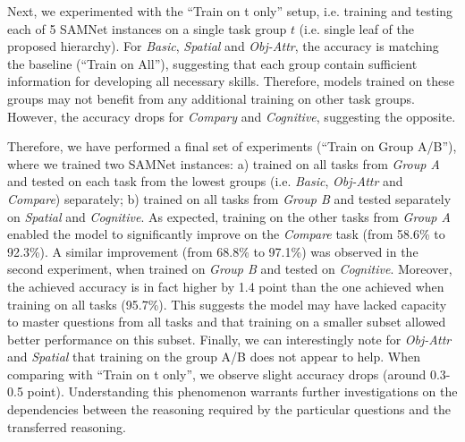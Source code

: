 Next, we experimented with the ``Train on t only'' setup, i.e. training and testing each of 5 SAMNet instances on a single task group $t$ (i.e. single leaf of the proposed hierarchy).
For \textit{Basic}, \textit{Spatial} and \textit{Obj-Attr}, the accuracy is matching the baseline (``Train on All''), suggesting that each group contain sufficient information for developing all necessary skills.
Therefore, models trained on these groups may not benefit from any additional training on other task groups.
However, the accuracy drops for \textit{Compary} and \textit{Cognitive}, suggesting the opposite.

Therefore, we have performed a final set of experiments (``Train on Group A/B''), where we trained two SAMNet instances: a) trained on all tasks from \textit{Group A} and tested on each task from the lowest groups (i.e. \textit{Basic}, \textit{Obj-Attr} and \textit{Compare}) separately; b) trained on all tasks from \textit{Group B} and tested separately on \textit{Spatial} and \textit{Cognitive}.
As expected, training on the other tasks from \textit{Group A} enabled the model to significantly improve on the \textit{Compare} task (from 58.6\% to 92.3\%).
A similar improvement (from 68.8\% to 97.1\%) was observed in the second experiment, when trained on \textit{Group B} and tested on \textit{Cognitive}.
Moreover, the achieved accuracy is in fact higher by 1.4 point than the one achieved when training on all tasks (95.7\%).
This suggests the model may have lacked capacity to master questions from all tasks and that training on a smaller subset allowed better performance on this subset.
Finally, we can interestingly note for \textit{Obj-Attr} and \textit{Spatial} that training on the group A/B does not appear to help. When comparing with ``Train on t only'', we observe slight accuracy drops (around 0.3-0.5 point).
Understanding this phenomenon warrants further investigations on the dependencies between the reasoning required by the particular questions and the transferred reasoning.

